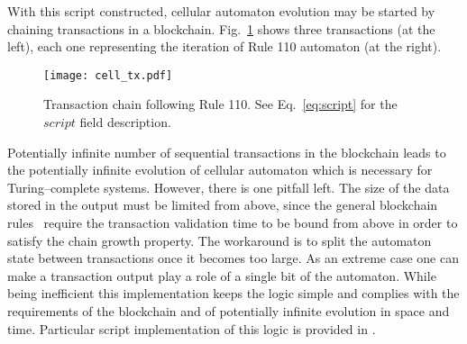 \documentclass[runningheads]{llncs}
\newcommand{\dnote}[1]{\textcolor{red}{D: {#1}}}
\newcommand{\vk}[1]{\textcolor{blue}{V: {#1}}}
\newcommand{\payload}{\textit{payload}}
\newcommand{\script}{\textit{script}}
\begin{document}

    With this script constructed, cellular automaton evolution may be started by
    chaining transactions in a blockchain. Fig.~\ref{fig:txs} shows three
    transactions (at the left), each one representing the iteration of Rule 110
    automaton (at the right).

    \begin{figure}[h]
        \centering
        \texttt{[image: cell\_tx.pdf]}
        \caption{Transaction chain following Rule 110. See Eq.~\ref{eq:script} for the
            $script$ field description.
        \label{fig:txs} }
    \end{figure}

    Potentially infinite number of sequential transactions in the
    blockchain leads to the potentially infinite evolution of cellular
    automaton which is necessary for Turing--complete systems.
    However, there is one pitfall left.
    The size of the data stored in the output must be limited from above, since
    the general blockchain rules~\cite{garay2015bitcoin} require the transaction validation
    time to be bound from above in order to satisfy the
    chain growth property. The workaround is to split
    the automaton state between transactions once it becomes too large. As an
    extreme case one can make a transaction output play a role of a single bit
    of the automaton. While being inefficient this implementation keeps
    the logic simple and complies with the requirements of the blockchain and
    of potentially infinite evolution in space and time. Particular script
    implementation of this logic is provided in .
\end{document}

